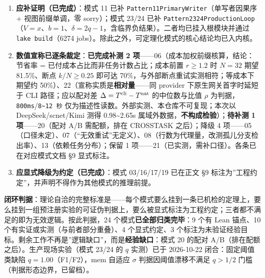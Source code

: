 \documentclass[
]{ctexart}
\providecommand{\tightlist}{%
  \setlength{\itemsep}{0pt}\setlength{\parskip}{0pt}}
\renewcommand{\_}{\discretionary{}{}{\textunderscore}}
\renewcommand{\text}[1]{\textnormal{#1}}
\begin{document}
\begin{enumerate}
\def\labelenumi{\arabic{enumi}.}
\tightlist
\item
  \textbf{应补证明（已完成）}：模式 11 已补
  \texttt{Pattern11\_PrimaryWriter}（单写者因果序 + 视图前缀单调，零
  sorry）；模式 23/24 已补
  \texttt{Pattern23\_24\_ProductionLoop}（\(V=x\)、\(b=1\)、\(\delta=2q-1\)，含临界负结果）。二者均已挂入根模块并通过
  \texttt{lake\ build}（6274
  jobs）。除此之外，可定理化模式的核心结论均已入内核。
\item
  \textbf{数值宣称已逐条裁定}：\textbf{已完成补测 2
  项}------06（成本加权前缀核算，结论：节省率 =
  已付成本占比而非任务计数占比；成本前置 \(r\ge1.2\) 时 \(N=32\) 期望
  81.5\%、断点 \(k/N\ge0.25\) 即可达
  70\%，与外部断点重试实测相符；等成本下期望约
  50\%）、22（宣称实质是\textbf{相对量}------同 provider
  下原生网关首字时延短于 CLI 路径；应以配对差
  \(\Delta=T^{\text{cli}}-T^{\text{nat}}\) 的中位数与比值 \(\rho\)
  为判据，\texttt{800ms}/\texttt{8\textasciitilde{}12\ 秒}
  仅为描述性读数。外部实测、本仓库不可复现；本次以 DeepSeek/scnet/Kimi
  测得 0.98\textasciitilde2.65s
  属域外数据，\textbf{不构成检验}）；\textbf{待补测 1 项}------20（配对
  A/B 需配额，排在 CROSS\_TASK 之后）；降级 4
  项------05（口径未定）、07（``无效重试''无定义）、08（行数为代理量，改测孤儿分支检出率）、13（依赖任务分布）；保留
  1 项------21（已实测，需补口径）。各条已在对应模式文档 §9 显式标注。
\item
  \textbf{应显式降级为约定（已完成）}：模式 03/16/17/19 已在正文 §9
  标注为''工程约定''，并声明不得作为其他模式的推理前提。
\end{enumerate}

\textbf{闭环判据}：理论自洽的完整标准是------每个模式要么挂到一条已机检的定理上，要么挂到一组预注册实验的可证伪判据上，要么被显式标注为工程约定；三者都不满足的即为无效逻辑。按此判据，24
个模式\textbf{已全部归类完毕}：9 个有 Lean 锚点、10
个有实证或实测（与前者部分重叠）、4 个显式约定、3
个标注为未验证经验目标。剩余工作不再是''逻辑缺口''，而是\textbf{经验缺口}：模式
20 的配对 A/B（排在配额之后）。生产现场实验（模式 23/24 的 \(q\)
实测）已于 2026-10-22 闭合：固定阈值类缺陷 \(q=1.00\)（F1/F2），mem
自适应 \(\sigma\) 判据因阈值漂移不满足 \(q>1/2\)
门槛（判据形态边界，已留档）。
\end{document}
